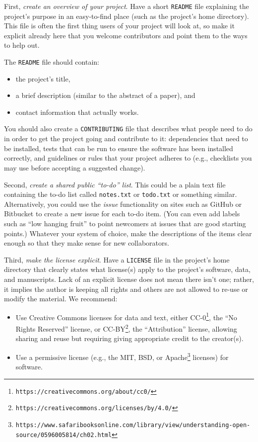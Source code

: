 \documentclass[10pt]{article}
\newcommand{\recommend}[1]{\textit{#1}}
\newcommand{\withurl}[2]{{#1}\footnote{\texttt{#2}}}
\begin{document}
First, \recommend{create an overview of your project}.  Have a short
\texttt{README} file explaining the project's purpose in an
easy-to-find place (such as the project's home directory). This file
is often the first thing users of your project will look at, so make
it explicit already here that you welcome contributors and point them
to the ways to help out.

The \texttt{README} file should contain:

\begin{itemize}
\item
  the project's title,
\item
  a brief description (similar to the abstract of a paper), and
\item
  contact information that actually works.
\end{itemize}

You should also create a \texttt{CONTRIBUTING} file that describes what
people need to do in order to get the project going and contribute to
it: dependencies that need to be installed, tests that can be run to
ensure the software has been installed correctly, and guidelines or
rules that your project adheres to (e.g., checklists you may use before
accepting a suggested change).

Second, \recommend{create a shared public ``to-do'' list}.  This could
be a plain text file containing the to-do list called
\texttt{notes.txt} or \texttt{todo.txt} or something
similar. Alternatively, you could use the \emph{issue} functionality
on sites such as GitHub or Bitbucket to create a new issue for each
to-do item. (You can even add labels such as ``low hanging fruit'' to
point newcomers at issues that are good starting points.)  Whatever
your system of choice, make the descriptions of the items clear enough
so that they make sense for new collaborators.

Third, \recommend{make the license explicit}.  Have a \texttt{LICENSE}
file in the project's home directory that clearly states what
license(s) apply to the project's software, data, and
manuscripts. Lack of an explicit license does not mean there isn't
one; rather, it implies the author is keeping all rights and others
are not allowed to re-use or modify the material. We recommend:

\begin{itemize}
\item
  Use Creative Commons licenses for data and text, either
  \withurl{CC-0}{https://creativecommons.org/about/cc0/}, the ``No Rights
  Reserved'' license, or
  \withurl{CC-BY}{https://creativecommons.org/licenses/by/4.0/}, the
  ``Attribution'' license, allowing sharing and reuse but requiring
  giving appropriate credit to the creator(s).
\item
  Use a permissive license (e.g., the \withurl{MIT, BSD, or
    Apache}{https://www.safaribooksonline.com/library/view/understanding-open-source/0596005814/ch02.html}
  licenses) for software.
\end{itemize}
\end{document}
